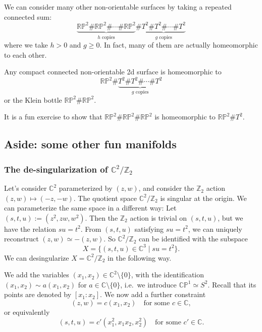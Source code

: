 \documentclass[12pt]{article}
\numberwithin{equation}{section}
\numberwithin{figure}{section}
\theoremstyle{remark}
\def\bC{\mathbb{C}}
\def\bZ{\mathbb{Z}}
\def\RP{\mathbb{RP}}
\def\CP{\mathbb{CP}}
\begin{document}
We can consider many other non-orientable surfaces by taking a repeated connected sum:
\begin{equation}
  \underbrace{\RP^2\#\RP^2\#\cdots\#\RP^2}_\text{$h$ copies}
  \#
  \underbrace{T^2\# T^2 \#\cdots\# T^2}_\text{$g$ copies}
\end{equation}
where we take $h>0$ and $g\ge 0$.
In fact, many of them are actually homeomorphic to each other.
\begin{fact}
Any compact connected non-orientable 2d surface is homeomorphic to
\begin{equation}
\RP^2 \# \underbrace{T^2\# T^2 \#\cdots\# T^2}_\text{$g$ copies}
\end{equation}
or the Klein bottle $\RP^2\#\RP^2$.
\end{fact}
It is a fun exercise to show that $\RP^2 \# \RP^2 \# \RP^2$ is homeomorphic to $\RP^2 \# T^2$.

\subsection{Aside: some other fun manifolds}


\subsubsection{The de-singularization of $\bC^2/\bZ_2$}
Let's consider $\bC^2$ parameterized by $(z,w)$,
and consider the $\bZ_2$ action $(z,w)\mapsto (-z,-w)$.
The quotient space $\bC^2/\bZ_2$ is singular at the origin.
We can parameterize the same space in a different way:
Let $(s,t,u):=(z^2, z w, w^2)$.
Then the $\bZ_2$ action is trivial on $(s,t,u)$, but we have the relation $su=t^2$.
From $(s,t,u)$ satisfying $su=t^2$, we can uniquely reconstruct $(z,w)\simeq -(z,w)$.
So $\bC^2/\bZ_2$ can be identified with the subspace \begin{equation}
X=\{ (s,t,u)\in \bC^3 \mid su=t^2 \}.
\end{equation}
We can desingularize $X=\bC^2/\bZ_2$ in the following way.

We add the variables $(x_1,x_2)\in \bC^2\setminus \{0\}$, with the identification 
$(x_1,x_2)\sim a(x_1,x_2)$ for $a\in \bC\setminus \{0\}$,
i.e.~we introduce $\CP^1\simeq S^2$.
Recall that its points are denoted by $[x_1:x_2]$.
We now add a further constraint \begin{equation}
(z,w) = c(x_1,x_2) \quad \text{for some $c\in \bC$},
\end{equation} or equivalently \begin{equation}
  (s,t,u)= c'(x_1^2, x_1 x_2, x_2^2) \quad \text{for some $c'\in \bC$}. \label{eq:blowup}
\end{equation}
\end{document}
